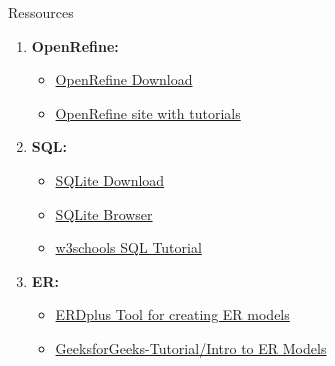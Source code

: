 \begin{frame}{Ressources}

\begin{enumerate}
    \item \textbf{OpenRefine:}
    \begin{itemize}
        \item \href{https://openrefine.org/download.html\#openrefine-32}{OpenRefine Download}
        \item \href{https://openrefine.org/}{OpenRefine site with tutorials}
    \end{itemize}
    \item \textbf{SQL:}
    \begin{itemize}
        \item \href{https://sqlite.org/download.html}{SQLite Download}
        \item \href{https://sqlitebrowser.org/dl/}{SQLite Browser}
        \item \href{https://www.w3schools.com/sql/}{w3schools SQL Tutorial}
    \end{itemize}
    \item \textbf{ER:}
    \begin{itemize}
        \item \href{https://erdplus.com/standalone}{ERDplus Tool for creating ER models}
        \item \href{https://www.geeksforgeeks.org/introduction-of-er-model/}{GeeksforGeeks-Tutorial/Intro to ER Models}
    \end{itemize}
\end{enumerate}

\end{frame}
